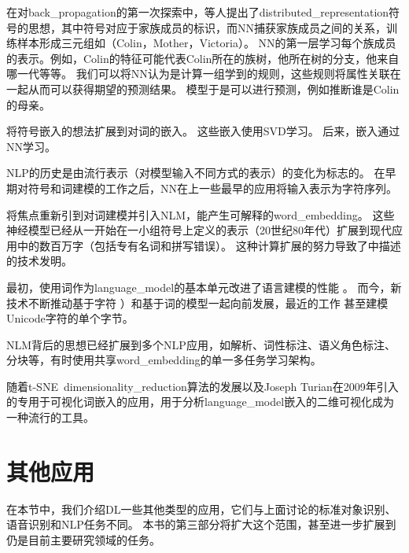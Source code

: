 在对\gls{back_propagation}的第一次探索中，\citet{Rumelhart86b-small}等人提出了\gls{distributed_representation}符号的思想，其中符号对应于家族成员的标识，而\gls{NN}捕获家族成员之间的关系，训练样本形成三元组如（Colin，Mother，Victoria）。
\gls{NN}的第一层学习每个族成员的表示。例如，Colin的特征可能代表Colin所在的族树，他所在树的分支，他来自哪一代等等。
我们可以将\gls{NN}认为是计算一组学到的规则，这些规则将属性关联在一起从而可以获得期望的预测结果。
模型于是可以进行预测，例如推断谁是Colin的母亲。

\cite{Deerwester90}将符号嵌入的想法扩展到对词的嵌入。
这些嵌入使用SVD学习。 
后来，嵌入通过\gls{NN}学习。

\gls{NLP}的历史是由流行表示（对模型输入不同方式的表示）的变化为标志的。
在早期对符号和词建模的工作之后，\gls{NN}在上一些最早的应用\citep{Miikkulainen91,Schmidhuber96}将输入表示为字符序列。

\citet{BenDucVin01-small} 将焦点重新引到对词建模并引入\gls{NLM}，能产生可解释的\gls{word_embedding}。
这些神经模型已经从一开始在一小组符号上定义的表示（20世纪80年代）扩展到现代应用中的数百万字（包括专有名词和拼写错误）。
这种计算扩展的努力导致了中描述的技术发明。


最初，使用词作为\gls{language_model}的基本单元改进了语言建模的性能 \citep{BenDucVin01-small}。
而今，新技术不断推动基于字符 \citep{Sutskever-et-al-ICML2011}）和基于词的模型一起向前发展，最近的工作 \citep{gillick2015multilingual}甚至建模Unicode字符的单个字节。

\gls{NLM}背后的思想已经扩展到多个\gls{NLP}应用，如解析\citep{Henderson-NAACL2003,Henderson-ACL2004,Collobert-AISTATS2011}、词性标注、语义角色标注、分块等，有时使用共享\gls{word_embedding}的单一多任务学习架构\citep{Collobert+Weston-ICML2008,collobert2011natural}。

随着t-SNE~\gls{dimensionality_reduction}算法的发展\citep{VanDerMaaten08-small}以及Joseph Turian在2009年引入的专用于可视化词嵌入的应用，用于分析\gls{language_model}嵌入的二维可视化成为一种流行的工具。

\section{其他应用}
\label{sec:other_applications}

在本节中，我们介绍\gls{DL}一些其他类型的应用，它们与上面讨论的标准对象识别、语音识别和\gls{NLP}任务不同。
本书的第三部分将扩大这个范围，甚至进一步扩展到仍是目前主要研究领域的任务。


